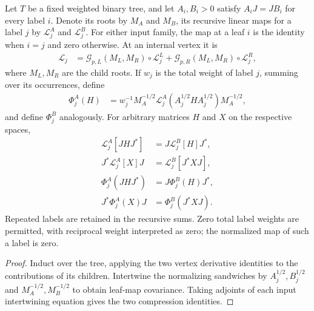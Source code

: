\begin{theorem}
\label{thm:mean_intertwiner_leaf_map}
\leanok
{}
Let $T$ be a fixed weighted binary tree, and let $A_i,B_i>0$ satisfy
$A_iJ=JB_i$ for every label $i$. Denote its roots by $M_A$ and $M_B$,
its recursive linear maps for a label $j$ by $\mathcal L_j^A$ and
$\mathcal L_j^B$. For either input family, the map at a leaf $i$ is the identity
when $i=j$ and zero otherwise. At an internal vertex it is
\begin{align}
 \mathcal L_j&=\mathcal G_{p,L}(M_L,M_R)\circ\mathcal L_j^L
   +\mathcal G_{p,R}(M_L,M_R)\circ\mathcal L_j^R,
 \label{eq:mean_recursive_label_map}
\end{align}
where $M_L,M_R$ are the child roots. If $w_j$ is the total weight of label $j$,
summing over its occurrences, define
\begin{align}
 \Phi_j^A(H)&=w_j^{-1}M_A^{-1/2}
   \mathcal L_j^A(A_j^{1/2}HA_j^{1/2})M_A^{-1/2},
 \label{eq:mean_recursive_normalized_map}
\end{align}
and define $\Phi_j^B$ analogously. For arbitrary matrices $H$ and $X$ on the
respective spaces,
\begin{align}
 \mathcal L_j^A[JHJ^*]&=J\mathcal L_j^B[H]J^*,
 \label{eq:mean_tree_derivative_embed}\\
 J^*\mathcal L_j^A[X]J&=\mathcal L_j^B[J^*XJ],
 \label{eq:mean_tree_derivative_compress}\\
 \Phi_j^A(JHJ^*)&=J\Phi_j^B(H)J^*,
 \label{eq:mean_leaf_map_embed}\\
 J^*\Phi_j^A(X)J&=\Phi_j^B(J^*XJ).
 \label{eq:mean_leaf_map_compress}
\end{align}
Repeated labels are retained in the recursive sums. Zero total label weights
are permitted, with reciprocal weight interpreted as zero; the normalized
map of such a label is zero.
\end{theorem}
\begin{proof}\leanok
{}
Induct over the tree, applying the two vertex derivative identities to the
contributions of its children. Intertwine the normalizing sandwiches by
$A_j^{1/2},B_j^{1/2}$ and $M_A^{-1/2},M_B^{-1/2}$ to obtain leaf-map
covariance. Taking adjoints of each input intertwining equation gives
the two compression identities.
\end{proof}

